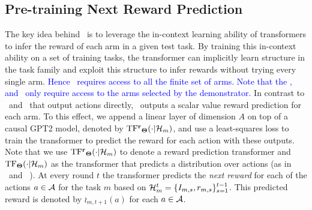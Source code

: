 \vspace*{-0.8em}
\subsection{Pre-training Next Reward Prediction}
\label{sec:training}
\vspace*{-0.5em}
The key idea behind \pred\ is to leverage the in-context learning ability of transformers to infer the reward of each arm in a given test task.
% 
By training this in-context ability on a set of training tasks, the transformer can implicitly learn structure in the task family and exploit this structure to infer rewards without trying every single arm.
%
\textcolor{blue}{Hence \pred\ requires access to all the finite set of arms. Note that the \ad, and \dpt\ only require access to the arms selected by the demonstrator.}
% 
In contrast to \dpt\ and \ad\ that output actions directly, \pred\ outputs a scalar value reward prediction for each arm.
% 
%
%
To this effect, we append a linear layer of dimension $A$ on top of a causal GPT2 model, denoted by $\mathrm{TF^{\mathbf{r}}}_{\mathbf{\Theta}}(\cdot | \mathcal{H}_m)$, and use a least-squares loss to train the transformer to predict the reward for each action with these outputs. 
%
Note that we use $\mathrm{TF^{\mathbf{r}}}_{\mathbf{\Theta}}(\cdot | \mathcal{H}_m)$ to denote a reward prediction transformer and $\mathrm{TF}_{\mathbf{\Theta}}(\cdot | \mathcal{H}_m)$ as the transformer that predicts a distribution over actions (as in \dpt\ and \ad\ ).
%
%
%
% 
At every round $t$ the transformer predicts the \emph{next reward} for each of the actions $a\in \mathcal{A}$ for the task $m$ based on $\mathcal{H}_m^t = \{I_{m,s}, r_{m,s}\}_{s=1}^{t-1}$. This predicted reward is denoted by $\wr_{m,t+1}(a)$ for each $a\in\mathcal{A}$. %

